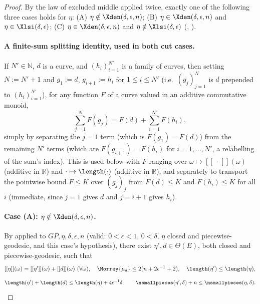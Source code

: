 \begin{proof}
  By the law of excluded middle applied twice, exactly one of the following three cases holds for
  $\eta$: (A) $\eta \notin \Xden(\delta,\epsilon,n)$; (B) $\eta \in \Xden(\delta,\epsilon,n)$ and
  $\eta \in \Xlsi(\delta,\epsilon)$; (C) $\eta \in \Xden(\delta,\epsilon,n)$ and $\eta \notin
  \Xlsi(\delta,\epsilon)$ (, ).

  \paragraph{A finite-sum splitting identity, used in both cut cases.} If $N'\in\mathbb{N}$, $d$ is
  a curve, and $(h_i)_{i=1}^{N'}$ is a family of curves, then setting $N:=N'+1$ and $g_1:=d$,
  $g_{i+1}:=h_i$ for $1\le i\le N'$ (i.e.\ $(g_j)_{j=1}^N$ is $d$ prepended to $(h_i)_{i=1}^{N'}$),
  for any function $F$ of a curve valued in an additive commutative monoid,
  \begin{equation}
    \label{eq:sum-split}
    \sum_{j=1}^N F(g_j) = F(d) + \sum_{i=1}^{N'} F(h_i)
    ,
  \end{equation}
  simply by separating the $j=1$ term (which is $F(g_1)=F(d)$) from the remaining $N'$ terms
  (which are $F(g_{i+1})=F(h_i)$ for $i=1,\dots,N'$, a relabelling of the sum's index). This is
  used below with $F$ ranging over $\omega\mapsto[[\,\cdot\,]](\omega)$ (additive in
  $\mathbb{R}$) and $\cdot\mapsto\length(\cdot)$ (additive in $\mathbb{R}$), and separately to
  transport the pointwise bound $F\le K$ over $(g_j)_j$ from $F(d)\le K$ and $F(h_i)\le K$ for all
  $i$ (immediate, since $j=1$ gives $d$ and $j=i+1$ gives $h_i$).

  \paragraph{Case (A): $\eta \notin \Xden(\delta,\epsilon,n)$.} By  applied to
  $GP,\eta,\delta,\epsilon,n$ (valid: $0<\epsilon<1$, $0<\delta$, $\eta$ closed and
  piecewise-geodesic, and this case's hypothesis), there exist $\eta',d \in \Theta(E)$, both closed
  and piecewise-geodesic, such that
  \[
    [[\eta]](\omega)=[[\eta']](\omega)+[[d]](\omega) \ (\forall\omega),\quad
    \Morrey{\mu_d} \le 2(n+2\epsilon^{-1}+2),\quad
    \length(\eta')\le\length(\eta),
  \]
  \[
    \length(\eta')+\length(d) \le \length(\eta)+4\epsilon^{-1}\delta
    , \qquad
    \nsmallpieces(\eta',\delta)+n \le \nsmallpieces(\eta,\delta)
    .
  \]


\end{proof}
